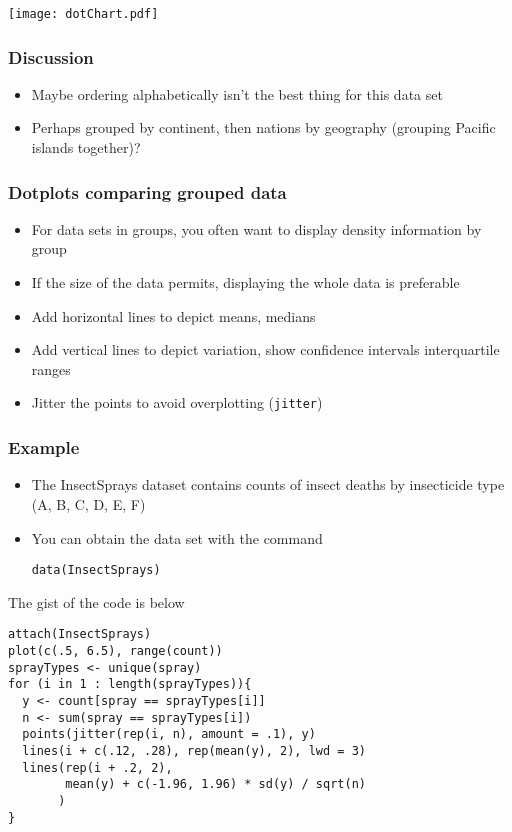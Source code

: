 \documentclass[aspectratio=169]{beamer}
\begin{document}
\begin{frame}
\texttt{[image: dotChart.pdf]}
\end{frame}

\begin{frame}\frametitle{Discussion}
\begin{itemize}
\item Maybe ordering alphabetically isn't the best thing for this data set
\item Perhaps grouped by continent, then nations by geography
  (grouping Pacific islands together)?
\end{itemize}
\end{frame}

\begin{frame}\frametitle{Dotplots comparing grouped data}
\begin{itemize}
\item For data sets in groups, you often want to display density
  information by group
\item If the size of the data permits, displaying the whole data
  is preferable
\item Add horizontal lines to depict means, medians
\item Add vertical lines to depict variation, show confidence intervals
  interquartile ranges
\item Jitter the points to avoid overplotting (\texttt{jitter})
\end{itemize}
\end{frame}

\begin{frame}[fragile]\frametitle{Example}
\begin{itemize}
\item The InsectSprays dataset contains counts of insect deaths by
  insecticide type (A, B, C, D, E, F)
\item You can obtain the data set with the command
\begin{verbatim}
data(InsectSprays)
\end{verbatim}
\end{itemize}
\end{frame}

\begin{frame}[fragile]
  The gist of the code is below
\begin{verbatim}
attach(InsectSprays)
plot(c(.5, 6.5), range(count))
sprayTypes <- unique(spray)
for (i in 1 : length(sprayTypes)){
  y <- count[spray == sprayTypes[i]]
  n <- sum(spray == sprayTypes[i])
  points(jitter(rep(i, n), amount = .1), y)
  lines(i + c(.12, .28), rep(mean(y), 2), lwd = 3)
  lines(rep(i + .2, 2), 
        mean(y) + c(-1.96, 1.96) * sd(y) / sqrt(n)
       )
}
\end{verbatim}
\end{frame}
\end{document}
